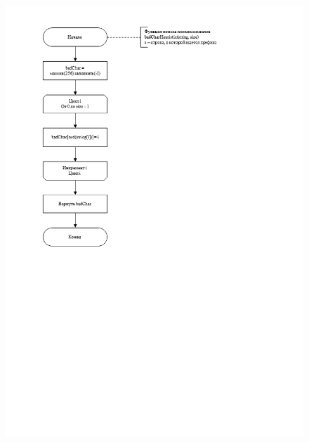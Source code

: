 \documentclass[../main.tex]{subfiles}
\begin{document}
	\begin{figure}[H]
		\centering
		\includegraphics[scale=0.7 ]{src/img/bm-prepare}
		\caption{}
		\label{fig:bm-prepare}
	\end{figure}
	
\end{document}
